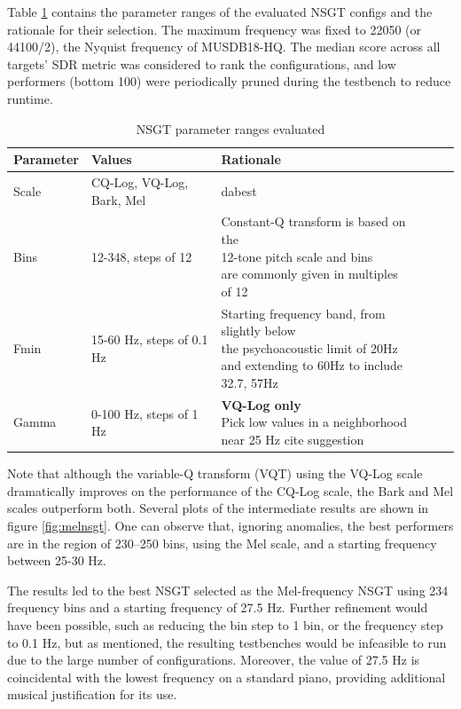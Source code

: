 \documentclass[letter,12pt,notitlepage]{article}
\begin{document}
Table \ref{table:nsgtparamsirm} contains the parameter ranges of the evaluated NSGT configs and the rationale for their selection. The maximum frequency was fixed to 22050 (or 44100/2), the Nyquist frequency of MUSDB18-HQ. The median score across all targets' SDR metric was considered to rank the configurations, and low performers (bottom 100) were periodically pruned during the testbench to reduce runtime.

\begin{table}[ht]
	\centering
\begin{tabular}{ |l|l|l|c|c|c| }
	 \hline
	  Parameter & Values & Rationale \\
	 \hline
	 \hline
	 Scale & CQ-Log, VQ-Log, Bark, Mel & dabest \\
	 \hline
	 Bins & 12-348, steps of 12 & \makecell[l] { Constant-Q transform is based on the \\ 12-tone pitch scale and bins \\ are commonly given in multiples of 12 } \\
	 \hline
	 Fmin & 15-60 Hz, steps of 0.1 Hz & \makecell[l] { Starting frequency band, from slightly below \\ the psychoacoustic limit of 20Hz \\ and extending to 60Hz to include 32.7, 57Hz } \\
	 \hline
	 Gamma & 0-100 Hz, steps of 1 Hz & \makecell[l] { \textbf{VQ-Log only}\\Pick low values in a neighborhood \\ near 25 Hz cite suggestion } \\
	 \hline
\end{tabular}
	\caption{NSGT parameter ranges evaluated}
	\label{table:nsgtparamsirm}
\end{table}

Note that although the variable-Q transform (VQT) using the VQ-Log scale dramatically improves on the performance of the CQ-Log scale, the Bark and Mel scales outperform both. Several plots of the intermediate results are shown in figure \ref{fig:melnsgt}. One can observe that, ignoring anomalies, the best performers are in the region of 230--250 bins, using the Mel scale, and a starting frequency between 25-30 Hz.

The results led to the best NSGT selected as the Mel-frequency NSGT using 234 frequency bins and a starting frequency of 27.5 Hz. Further refinement would have been possible, such as reducing the bin step to 1 bin, or the frequency step to 0.1 Hz, but as mentioned, the resulting testbenches would be infeasible to run due to the large number of configurations. Moreover, the value of 27.5 Hz is coincidental with the lowest frequency on a standard piano, providing additional musical justification for its use.
\end{document}
